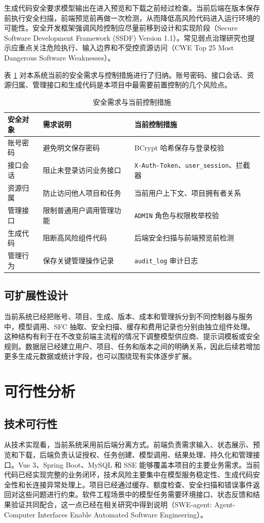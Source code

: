 生成代码安全要求模型输出在进入预览和下载之前经过检查。当前后端在版本保存前执行安全扫描，前端预览前再做一次检测，从而降低高风险代码进入运行环境的可能性。安全开发框架强调风险控制应尽量前移到设计和实现阶段（Secure Software Development Framework (SSDF) Version 1.1）\cite{nistssdf2024}。常见弱点治理研究也提示应重点关注危险执行、输入边界和不受控资源访问（CWE Top 25 Most Dangerous Software Weaknesses）\cite{cwe2024top25}。

表 \ref{tab:chapter3-security} 对本系统当前的安全需求与控制措施进行了归纳。账号密码、接口会话、资源归属、管理接口和生成代码是本项目中最需要前置控制的几个风险点。

\begin{table}[htbp]
\centering
\caption{安全需求与当前控制措施}
\label{tab:chapter3-security}
\small
\begin{tabular}{@{}p{}p{}p{}@{}}
\toprule
安全对象 & 需求说明 & 当前控制措施 \\
\midrule
账号密码 & 避免明文保存密码 & BCrypt 哈希保存与登录校验 \\
接口会话 & 阻止未登录访问业务接口 & \texttt{X-Auth-Token}、\texttt{user\_session}、拦截器 \\
资源归属 & 防止访问他人项目和任务 & 当前用户上下文、项目拥有者关系 \\
管理接口 & 限制普通用户调用管理功能 & \texttt{ADMIN} 角色与权限枚举校验 \\
生成代码 & 阻断高风险组件代码 & 后端安全扫描与前端预览前检测 \\
管理行为 & 保存关键管理操作记录 & \texttt{audit\_log} 审计日志 \\
\bottomrule
\end{tabular}
\end{table}

\subsection{可扩展性设计}
当前系统已经把账号、项目、生成、版本、成本和管理拆分到不同控制器与服务中，模型调用、SFC 抽取、安全扫描、缓存和费用记录也分别由独立组件处理。这种结构有利于在不改变前端主流程的情况下调整模型供应商、提示词模板或安全规则。数据层已经建立用户、项目、任务和版本之间的明确关系，因此后续若增加更多生成元数据或统计字段，也可以围绕现有实体逐步扩展。

\section{可行性分析}
\subsection{技术可行性}
从技术实现看，当前系统采用前后端分离方式。前端负责需求输入、状态展示、预览和下载，后端负责认证授权、任务创建、模型调用、结果处理、持久化和管理接口。Vue 3、Spring Boot、MySQL 和 SSE 能够覆盖本项目的主要业务需求。当前代码已经实现完整的业务闭环，技术风险主要集中在模型服务稳定性、生成代码安全性和长连接异常处理上。项目已经通过缓存、额度检查、安全扫描和错误事件返回对这些问题进行约束。软件工程场景中的模型任务需要环境接口、状态反馈和结果验证共同配合，这一点已经在相关研究中得到说明（SWE-agent: Agent-Computer Interfaces Enable Automated Software Engineering）\cite{yang2024sweagent}。

